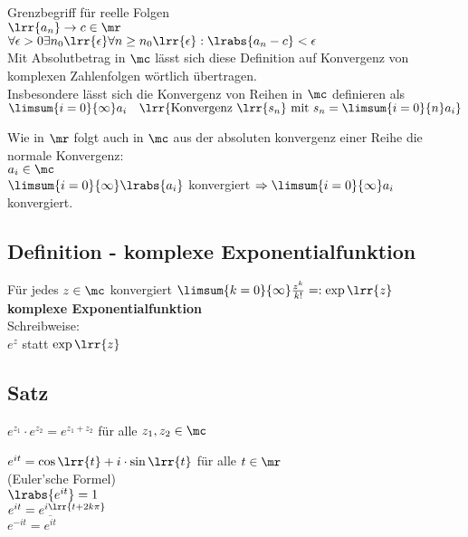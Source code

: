 			Grenzbegriff für reelle Folgen\\
			$\lrr{a_n}\rightarrow c\in\mr$\\
			$\forall\epsilon >0\exists n_0\lrr{\epsilon}\forall n\geq n_0\lrr{\epsilon}:\lrabs{a_n-c}<\epsilon$\\
			Mit Absolutbetrag in $\mc$ lässt sich diese Definition auf Konvergenz von komplexen Zahlenfolgen wörtlich übertragen.\\
			Insbesondere lässt sich die Konvergenz von Reihen in $\mc$ definieren als\\
			$\limsum{i=0}{\infty}a_i\quad\lrr{\mbox{Konvergenz } \lrr{s_n} \mbox{ mit } s_n=\limsum{i=0}{n}a_i}$
			
			Wie in $\mr$ folgt auch in $\mc$ aus der absoluten konvergenz einer Reihe die normale Konvergenz:\\
			$a_i\in\mc$\\
			$\limsum{i=0}{\infty}\lrabs{a_i}$ konvergiert $\Rightarrow \limsum{i=0}{\infty}a_i$ konvergiert.
	\subExEnd

\subsection{Definition - komplexe Exponentialfunktion}
	Für jedes $z\in\mc$ konvergiert $\limsum{k=0}{\infty}\frac{z^k}{k!}=:\exp\lrr{z}$\\
	\textbf{komplexe Exponentialfunktion}\\
	Schreibweise:\\
	$e^z$ statt $\exp\lrr{z}$

\subsection{Satz}
		\item $e^{z_1}\cdot e^{z_2}=e^{z_1+z_2}$ für alle $z_1,z_2\in\mc$
		\item $e^{it}=\cos\lrr{t}+i\cdot\sin\lrr{t}$ für alle $t\in\mr$\\
			(Euler'sche Formel)\\
			$\lrabs{e^{it}}=1$\\
			$e^{it}=e^{i\lrr{t+2k\pi}}$\\
			$e^{-it}=\overline{e^{it}}$
			
